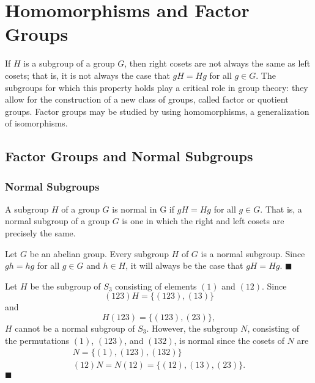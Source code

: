 \chapter{Homomorphisms and Factor Groups}\label{normal}

If $H$ is a subgroup of a group $G$, then right cosets are not always the same as left cosets; that is, it is not always the case that $gH = Hg$ for all $g \in G$.  The subgroups for which this property holds play a critical role in group theory: they allow for the construction of a new class of groups, called factor or quotient groups.  Factor groups may be studied by using homomorphisms, a generalization of isomorphisms. 
 

\section{Factor Groups and Normal Subgroups}
 

\subsection*{Normal Subgroups}

A subgroup $H$ of a group $G$ is {\bfi
normal\/} in G if $gH =
Hg$ for all $g \in G$. That is, a normal subgroup of a group $G$ is
one in which the right and left cosets are precisely the same. 
 
 
\medskip
 
 
Let $G$ be an abelian group. Every subgroup $H$ of $G$ is a normal
subgroup.  Since $gh = hg$ for all $g \in G$ and $h \in H$, it will
always be the case that $gH = Hg$. 
\hspace{\fill} $\blacksquare$
 
 
\medskip
 
 
Let $H$ be the subgroup of $S_3$ consisting of elements $(1)$ and
$(12)$. Since 
$$
(123) H = \{ (123), (13) \}
$$
and
$$
H (123) = \{ (123), (23) \},
$$
$H$ cannot be a normal subgroup of $S_3$.  However, the subgroup $N$,
consisting of the permutations $(1)$, $(123)$, and $(132)$, is normal
since the cosets of $N$ are 
$$
\begin{array}{c}
N  =   \{ (1), (123), (132) \} \\
(12) N =  N (12)  =  \{ (12), (13), (23) \}.
\end{array}
$$
\hspace{\fill} $\blacksquare$
 
